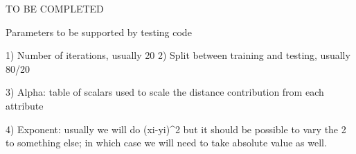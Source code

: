 TO BE COMPLETED

Parameters to be supported by testing code

1) Number of iterations, usually 20
2) Split between training and testing, usually 80/20

3) Alpha: table of scalars used to scale the distance contribution from each
attribute

4) Exponent: usually we will do (xi-yi)^2 but it should be possible 
to vary the 2 to something else; in which case we will need to take absolute
value as well.


